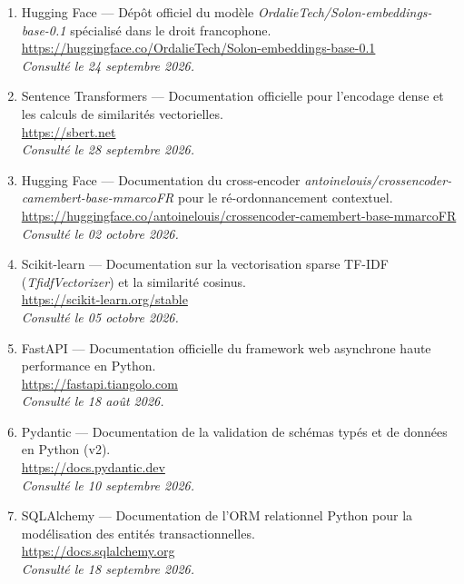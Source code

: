 \begin{enumerate}
  \item Hugging Face — Dépôt officiel du modèle \textit{OrdalieTech/Solon-embeddings-base-0.1} spécialisé dans le droit francophone.\\
        \url{https://huggingface.co/OrdalieTech/Solon-embeddings-base-0.1}\\
        \textit{Consulté le 24 septembre 2026.}

  \item Sentence Transformers — Documentation officielle pour l'encodage dense et les calculs de similarités vectorielles.\\
        \url{https://sbert.net}\\
        \textit{Consulté le 28 septembre 2026.}

  \item Hugging Face — Documentation du cross-encoder \textit{antoinelouis/crossencoder-camembert-base-mmarcoFR} pour le ré-ordonnancement contextuel.\\
        \url{https://huggingface.co/antoinelouis/crossencoder-camembert-base-mmarcoFR}\\
        \textit{Consulté le 02 octobre 2026.}

  \item Scikit-learn — Documentation sur la vectorisation sparse TF-IDF (\textit{TfidfVectorizer}) et la similarité cosinus.\\
        \url{https://scikit-learn.org/stable}\\
        \textit{Consulté le 05 octobre 2026.}


  \item FastAPI — Documentation officielle du framework web asynchrone haute performance en Python.\\
        \url{https://fastapi.tiangolo.com}\\
        \textit{Consulté le 18 août 2026.}

  \item Pydantic — Documentation de la validation de schémas typés et de données en Python (v2).\\
        \url{https://docs.pydantic.dev}\\
        \textit{Consulté le 10 septembre 2026.}

  \item SQLAlchemy — Documentation de l'ORM relationnel Python pour la modélisation des entités transactionnelles.\\
        \url{https://docs.sqlalchemy.org}\\
        \textit{Consulté le 18 septembre 2026.}


\end{enumerate}
